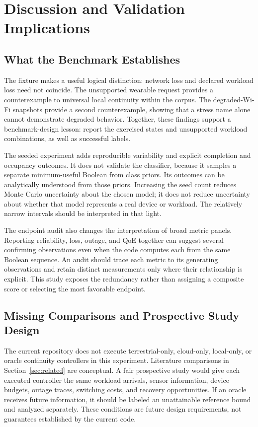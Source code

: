 \section{Discussion and Validation Implications}
\label{sec:discussion}
\subsection{What the Benchmark Establishes}
The fixture makes a useful logical distinction: network loss and declared workload loss need not coincide. The unsupported wearable request provides a counterexample to universal local continuity within the corpus. The degraded-Wi-Fi snapshots provide a second counterexample, showing that a stress name alone cannot demonstrate degraded behavior. Together, these findings support a benchmark-design lesson: report the exercised states and unsupported workload combinations, as well as successful labels.

The seeded experiment adds reproducible variability and explicit completion and occupancy outcomes. It does not validate the classifier, because it samples a separate minimum-useful Boolean from class priors. Its outcomes can be analytically understood from those priors. Increasing the seed count reduces Monte Carlo uncertainty about the chosen model; it does not reduce uncertainty about whether that model represents a real device or workload. The relatively narrow intervals should be interpreted in that light.

The endpoint audit also changes the interpretation of broad metric panels. Reporting reliability, loss, outage, and QoE together can suggest several confirming observations even when the code computes each from the same Boolean sequence. An audit should trace each metric to its generating observations and retain distinct measurements only where their relationship is explicit. This study exposes the redundancy rather than assigning a composite score or selecting the most favorable endpoint.

\subsection{Missing Comparisons and Prospective Study Design}
The current repository does not execute terrestrial-only, cloud-only, local-only, or oracle continuity controllers in this experiment. Literature comparisons in Section~\ref{sec:related} are conceptual. A fair prospective study would give each executed controller the same workload arrivals, sensor information, device budgets, outage traces, switching costs, and recovery opportunities. If an oracle receives future information, it should be labeled an unattainable reference bound and analyzed separately. These conditions are future design requirements, not guarantees established by the current code.

